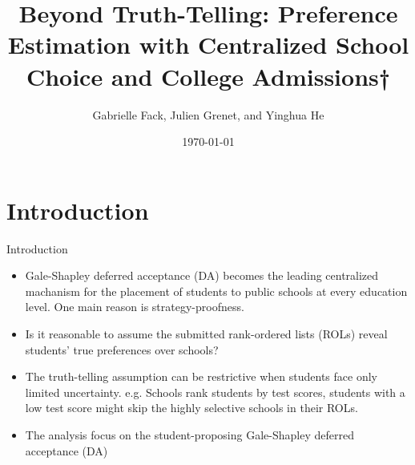 \documentclass[dvipsnames,mathserif]{beamer}
\begin{document}
\rightskip\rightmargin
\title{Beyond Truth-Telling: Preference Estimation with Centralized School Choice and College Admissions†}
\author{Gabrielle Fack, Julien Grenet, and Yinghua He}


\footnotesize{\date{\today }


\begin{frame}
\maketitle
\end{frame}


%
\footnotesize \tableofcontents
%
\section{Introduction}
\begin{frame}{Introduction}
    \begin{itemize}
        \item Gale-Shapley deferred acceptance (DA) becomes the leading centralized machanism for the placement of students to public schools at every education level. One main reason is strategy-proofness.\\
        \item Is it reasonable to assume the submitted rank-ordered lists (ROLs) reveal students' true preferences over schools?\\
        \item The truth-telling assumption can be restrictive when students face only limited uncertainty. e.g. Schools rank students by test scores, students with a low test score might skip the highly selective schools in their ROLs.\\
        \item The analysis focus on the student-proposing Gale-Shapley deferred acceptance (DA)
        
    \end{itemize}
\end{frame}

}
\end{document}
